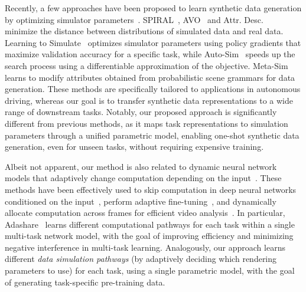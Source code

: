 \vspace{1mm}
 Recently, a few approaches have been proposed to learn synthetic data generation by optimizing simulator parameters~\cite{ruiz2018learning,kim2021drivegan,yang2020learning,behl2020autosimulate}. SPIRAL~\cite{ganin2018synthesizing}, AVO~\cite{louppe2019adversarial} and Attr. Desc.~\cite{yue2019domain} minimize the distance between distributions of simulated data and real data. Learning to Simulate~\cite{ruiz2018learning} optimizes simulator parameters using policy gradients that maximize validation accuracy for a specific task, while Auto-Sim~\cite{behl2020autosimulate} speeds up the search process using a differentiable approximation of the objective.
Meta-Sim~\cite{kar2019meta,devaranjan2020meta} learns to modify attributes obtained from probabilistic scene grammars for data generation.  These methods are specifically tailored to applications in autonomous driving, whereas our goal is to transfer synthetic data representations to a wide range of downstream tasks. Notably, our proposed approach is significantly different from previous methods, as it maps task representations to simulation parameters through a unified parametric model, enabling one-shot synthetic data generation, even for unseen tasks, without requiring expensive training.

\vspace{1mm}
 Albeit not apparent, our method is also related to dynamic neural network models that adaptively change computation depending on the input~\cite{han2021dynamic}. These methods have been effectively used to skip computation in deep neural networks conditioned on the input~\cite{wu2018blockdrop,wang2018skipnet,veit2018convolutional}, perform adaptive fine-tuning~\cite{guo2019spottune}, and dynamically allocate computation across frames for efficient video analysis~\cite{wu2019adaframe,meng2020ar}. In particular, Adashare~\cite{sun2019adashare} learns different computational pathways for each task within a single multi-task network model, with the goal of improving efficiency and minimizing negative interference in multi-task learning. Analogously, our approach learns different {\em data simulation pathways} (by adaptively deciding which rendering parameters to use) for each task, using a single parametric model, with the goal of generating task-specific pre-training data.

